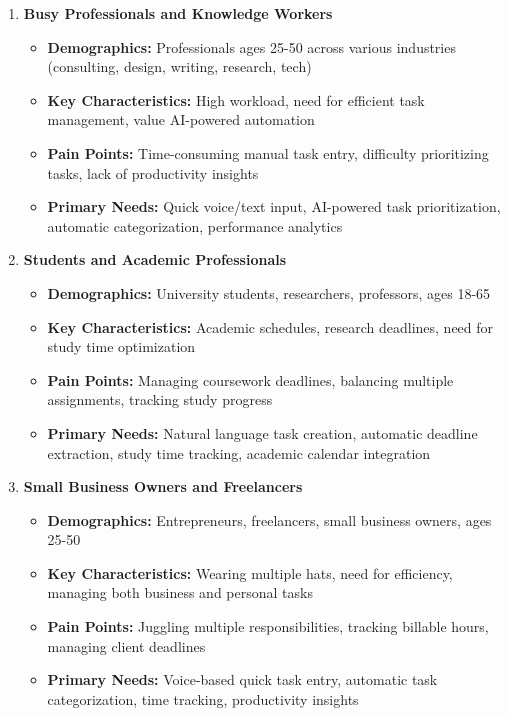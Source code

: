 \documentclass[12pt,a4paper]{article}
\begin{document}
\begin{enumerate}
    \item \textbf{Busy Professionals and Knowledge Workers}
    \begin{itemize}
        \item \textbf{Demographics:} Professionals ages 25-50 across various industries (consulting, design, writing, research, tech)
        \item \textbf{Key Characteristics:} High workload, need for efficient task management, value AI-powered automation
        \item \textbf{Pain Points:} Time-consuming manual task entry, difficulty prioritizing tasks, lack of productivity insights
        \item \textbf{Primary Needs:} Quick voice/text input, AI-powered task prioritization, automatic categorization, performance analytics
    \end{itemize}
    
    \item \textbf{Students and Academic Professionals}
    \begin{itemize}
        \item \textbf{Demographics:} University students, researchers, professors, ages 18-65
        \item \textbf{Key Characteristics:} Academic schedules, research deadlines, need for study time optimization
        \item \textbf{Pain Points:} Managing coursework deadlines, balancing multiple assignments, tracking study progress
        \item \textbf{Primary Needs:} Natural language task creation, automatic deadline extraction, study time tracking, academic calendar integration
    \end{itemize}
    
    \item \textbf{Small Business Owners and Freelancers}
    \begin{itemize}
        \item \textbf{Demographics:} Entrepreneurs, freelancers, small business owners, ages 25-50
        \item \textbf{Key Characteristics:} Wearing multiple hats, need for efficiency, managing both business and personal tasks
        \item \textbf{Pain Points:} Juggling multiple responsibilities, tracking billable hours, managing client deadlines
        \item \textbf{Primary Needs:} Voice-based quick task entry, automatic task categorization, time tracking, productivity insights
    \end{itemize}
    

\end{enumerate}
\end{document}
